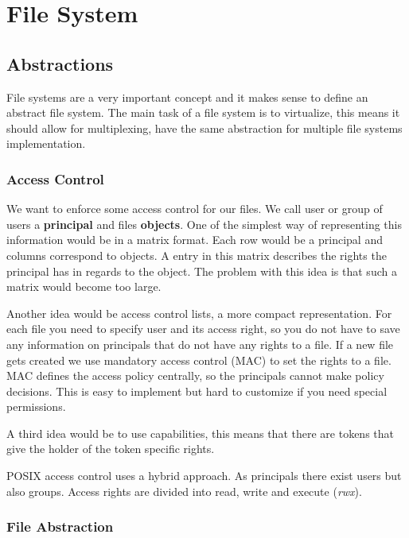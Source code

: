 \section{File System}


\subsection{Abstractions}

File systems are a very important concept and it makes sense to define an abstract file system. The main task of a file system is to virtualize, this means it should allow for multiplexing, have the same abstraction for multiple file systems implementation.

\subsubsection{Access Control}

We want to enforce some access control for our files. We call user or group of users a \textbf{principal} and files \textbf{objects}. One of the simplest way of representing this information would be in a matrix format. Each row would be a principal and columns correspond to objects. A entry in this matrix describes the rights the principal has in regards to the object. The problem with this idea is that such a matrix would become too large. \medskip

Another idea would be access control lists, a more compact representation. For each file you need to specify user and its access right, so you do not have to save any information on principals that do not have any rights to a file. If a new file gets created we use mandatory access control (MAC) to set the rights to a file. MAC defines the access policy centrally, so the principals cannot make policy decisions. This is easy to implement but hard to customize if you need special permissions. \medskip

A third idea would be to use capabilities, this means that there are tokens that give the holder of the token specific rights. \medskip

POSIX access control uses a hybrid approach. As principals there exist users but also groups. Access rights are divided into read, write and execute (\textit{rwx}). 

\subsubsection{File Abstraction}

